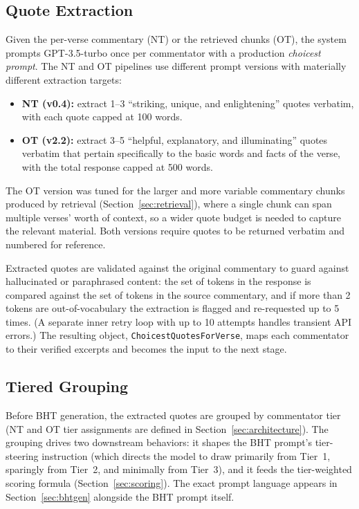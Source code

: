 \subsection{Quote Extraction}
\label{sec:quoteextraction}

Given the per-verse commentary (NT) or the retrieved chunks (OT), the system prompts GPT-3.5-turbo \citep{openai2023gpt35} once per commentator with a production \textit{choicest prompt}. The NT and OT pipelines use different prompt versions with materially different extraction targets:

\begin{itemize}[nosep,leftmargin=*]
    \item \textbf{NT (v0.4):} extract 1--3 ``striking, unique, and enlightening'' quotes verbatim, with each quote capped at 100 words.
    \item \textbf{OT (v2.2):} extract 3--5 ``helpful, explanatory, and illuminating'' quotes verbatim that pertain specifically to the basic words and facts of the verse, with the total response capped at 500 words.
\end{itemize}

\noindent The OT version was tuned for the larger and more variable commentary chunks produced by retrieval (Section~\ref{sec:retrieval}), where a single chunk can span multiple verses' worth of context, so a wider quote budget is needed to capture the relevant material. Both versions require quotes to be returned verbatim and numbered for reference.

Extracted quotes are validated against the original commentary to guard against hallucinated or paraphrased content: the set of tokens in the response is compared against the set of tokens in the source commentary, and if more than 2 tokens are out-of-vocabulary the extraction is flagged and re-requested up to 5 times. (A separate inner retry loop with up to 10 attempts handles transient API errors.) The resulting object, \texttt{ChoicestQuotesForVerse}, maps each commentator to their verified excerpts and becomes the input to the next stage.

\subsection{Tiered Grouping}

Before BHT generation, the extracted quotes are grouped by commentator tier (NT and OT tier assignments are defined in Section~\ref{sec:architecture}). The grouping drives two downstream behaviors: it shapes the BHT prompt's tier-steering instruction (which directs the model to draw primarily from Tier~1, sparingly from Tier~2, and minimally from Tier~3), and it feeds the tier-weighted scoring formula (Section~\ref{sec:scoring}). The exact prompt language appears in Section~\ref{sec:bhtgen} alongside the BHT prompt itself.


